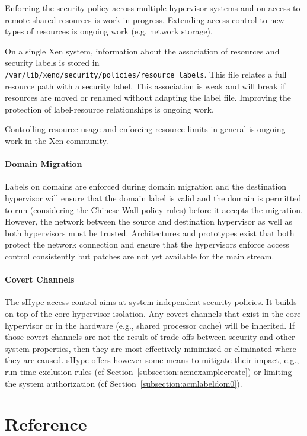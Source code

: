 \documentclass[11pt,twoside,final,openright]{report}
\begin{document}
Enforcing the security policy across multiple hypervisor systems and
on access to remote shared resources is work in progress. Extending
access control to new types of resources is ongoing work (e.g. network
storage).

On a single Xen system, information about the association of resources
and security labels is stored in
\verb|/var/lib/xend/security/policies/resource_labels|. This file relates
a full resource path with a security label. This association is weak
and will break if resources are moved or renamed without adapting the
label file. Improving the protection of label-resource relationships
is ongoing work.

Controlling resource usage and enforcing resource limits in general is
ongoing work in the Xen community.

\subsection{Domain Migration}

Labels on domains are enforced during domain migration and the
destination hypervisor will ensure that the domain label is valid and
the domain is permitted to run (considering the Chinese Wall policy
rules) before it accepts the migration.  However, the network between
the source and destination hypervisor as well as both hypervisors must
be trusted. Architectures and prototypes exist that both protect the
network connection and ensure that the hypervisors enforce access
control consistently but patches are not yet available for the main
stream.

\subsection{Covert Channels}

The sHype access control aims at system independent security policies.
It builds on top of the core hypervisor isolation. Any covert channels
that exist in the core hypervisor or in the hardware (e.g., shared
processor cache) will be inherited. If those covert channels are not
the result of trade-offs between security and other system properties,
then they are most effectively minimized or eliminated where they are
caused. sHype offers however some means to mitigate their impact, e.g.,
run-time exclusion rules (cf Section~\ref{subsection:acmexamplecreate})
or limiting the system authorization (cf Section~\ref{subsection:acmlabeldom0}).


\part{Reference}
\end{document}
